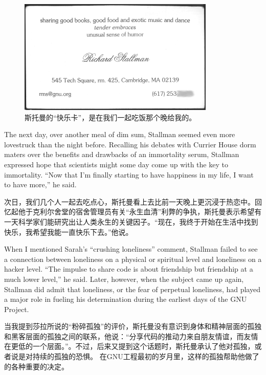 \ifdefined\chs
\begin{figure}[ht] \centering
  \includegraphics{pleasurecard}
  \caption{斯托曼的``快乐卡''，是在我们一起吃饭那个晚给我的。}
\end{figure}
\fi

\ifdefined\eng
The next day, over another meal of dim sum, Stallman seemed even more lovestruck than the night before. Recalling his debates with Currier House dorm maters over the benefits and drawbacks of an immortality serum, Stallman expressed hope that scientists might some day come up with the key to immortality. ``Now that I'm finally starting to have happiness in my life, I want to have more,'' he said.
\fi

\ifdefined\chs
次日，我们几个人一起去吃点心，斯托曼看上去比前一天晚上更沉浸于热恋中。回忆起他于克利尔舍堂的宿舍管理员有关``永生血清''利弊的争执，斯托曼表示希望有一天科学家们能研究出让人类永生的关键因子。``现在，我终于开始在生活中找到快乐，我希望我能一直快乐下去。''他说。
\fi

\ifdefined\eng
When I mentioned Sarah's ``crushing loneliness'' comment, Stallman failed to see a connection between loneliness on a physical or spiritual level and loneliness on a hacker level. ``The impulse to share code is about friendship but friendship at a much lower level,'' he said. Later, however, when the subject came up again, Stallman did admit that loneliness, or the fear of perpetual loneliness, %
had played a major role in fueling his determination during the earliest days of the GNU Project.
\fi

\ifdefined\chs
当我提到莎拉所说的``粉碎孤独''的评价，斯托曼没有意识到身体和精神层面的孤独和黑客层面的孤独之间的联系，他说：``分享代码的推动力来自朋友情谊，而友情在更低的一个层面。''。不过，后来又提到这个话题时，斯托曼承认了他对孤独，或者说是对持续的孤独的恐惧。%
在GNU工程最初的岁月里，这样的孤独帮助他做了的各种重要的决定。
\fi

